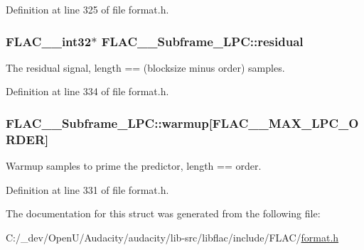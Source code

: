 Definition at line 325 of file format.\+h.

\subsubsection[{\texorpdfstring{residual}{residual}}]{ {\bf F\+L\+A\+C\+\_\+\+\_\+int32}$\ast$ F\+L\+A\+C\+\_\+\+\_\+\+Subframe\+\_\+\+L\+P\+C\+::residual}\hypertarget{struct_f_l_a_c_____subframe___l_p_c_acae4d0d439ea8900c5771eb967aec9bf}{}\label{struct_f_l_a_c_____subframe___l_p_c_acae4d0d439ea8900c5771eb967aec9bf}
The residual signal, length == (blocksize minus order) samples. 

Definition at line 334 of file format.\+h.

\subsubsection[{\texorpdfstring{warmup}{warmup}}]{ F\+L\+A\+C\+\_\+\+\_\+\+Subframe\+\_\+\+L\+P\+C\+::warmup\mbox{[}{\bf F\+L\+A\+C\+\_\+\+\_\+\+M\+A\+X\+\_\+\+L\+P\+C\+\_\+\+O\+R\+D\+ER}\mbox{]}}\hypertarget{struct_f_l_a_c_____subframe___l_p_c_a91c6c71c6fc2b812da1d2a3761e29807}{}\label{struct_f_l_a_c_____subframe___l_p_c_a91c6c71c6fc2b812da1d2a3761e29807}
Warmup samples to prime the predictor, length == order. 

Definition at line 331 of file format.\+h.



The documentation for this struct was generated from the following file\+:\begin{DoxyCompactItemize}
\item 
C\+:/\+\_\+dev/\+Open\+U/\+Audacity/audacity/lib-\/src/libflac/include/\+F\+L\+A\+C/\hyperlink{include_2_f_l_a_c_2format_8h}{format.\+h}\end{DoxyCompactItemize}
